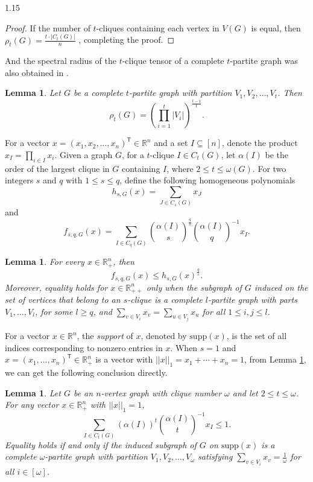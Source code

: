 \documentclass[preprint,12pt]{elsarticle1}
\newtheorem{lem}[thm]{Lemma}
\numberwithin{equation}{section}
\begin{document}
\begin{spacing}{1.15}
\begin{proof}
If the number of $t$-cliques containing each vertex in $V(G)$ is equal, then $\rho_{t}(G)=\frac{t\cdot|C_t(G)|}{n}$ \cite{liujoco}, completing the proof.
\end{proof}

And the spectral radius of the $t$-clique tensor of a complete $t$-partite graph was also obtained in \cite{liujoco}.

\begin{lem}\cite{liujoco}\label{111}
   Let $G$ be a complete $t$-partite graph with partition $V_1,V_2,\ldots,V_{t}$. Then
   $$\rho_{t}(G)=\left( \prod_{i=1}^{t}|V_i| \right)^{\frac{t-1}{t}}.$$ 
\end{lem}

For a vector $x=(x_1,x_2,\ldots,x_n)^{\mathsf{T}}\in\mathbb{R}^{n}$ and a set $I\subseteq[n]$, denote the product $x_I=\prod_{i\in I}x_i$.
Given a graph $G$, for  a $t$-clique $I\in C_t(G)$, let $\alpha(I)$ be the order of the largest clique in $G$ containing $I$, where $2\le t\le \omega(G)$.
For two integers $s$ and $q$ with $1\le s\le q$, define the following homogeneous polynomials $$h_{s,G}(x)=\sum_{J\in C_s(G)}x_J$$ and $$f_{s,q,G}(x)=\sum_{I\in C_q(G)}\binom{\alpha(I)}{s}^{\frac{q}{s}}\binom{\alpha(I)}{q}^{-1}x_I.$$

\begin{lem}\cite{macl}\label{macl}
For every $x\in\mathbb{R}^{n}_{+}$, then $$f_{s,q,G}(x)\le h_{s,G}(x)^{\frac{q}{s}}.$$
Moreover, equality holds for $x\in\mathbb{R}^{n}_{++}$ only when the subgraph of $G$ induced on the set of vertices that belong to an $s$-clique is a complete $l$-partite graph with parts $V_1,\ldots,V_l$, for some $l\ge q$, and $\sum_{v\in V_i}x_v=\sum_{u\in V_j}x_u$ for all $1\le i,j\le l$.
\end{lem}

For a vector $x\in\mathbb{R}^{n}$, the \textit{support} of $x$, denoted by $\mathrm{supp}(x)$, is the set of all indices corresponding to nonzero entries in $x$.
When $s=1$ and $x=(x_1,\ldots,x_n)^{\mathsf{T}}\in\mathbb{R}^{n}_{+}$ is a vector with $||x||_1=x_1+\cdots+x_n=1$, from Lemma \ref{macl}, we can get the following conclusion directly.

\begin{lem}\label{w1}
Let $G$ be an $n$-vertex graph with clique number $\omega$ and let $2\le t\le\omega$. For any vector $x\in\mathbb{R}^{n}_{+}$ with $||x||_{1}=1$,
\begin{equation*}\label{whms}
\sum_{I\in C_t(G)}\left(\alpha(I)\right)^t\binom{\alpha(I)}{t}^{-1}x_I\le1.
\end{equation*}
Equality holds if and only if the induced subgraph of $G$ on $\mathrm{supp}(x)$ is a complete $\omega$-partite graph with partition $V_1, V_2, \ldots, V_{\omega}$ satisfying $\sum_{v\in V_i}x_v=\frac{1}{\omega}$ for all $i\in[\omega]$.
\end{lem}


\end{spacing}
\end{document}
